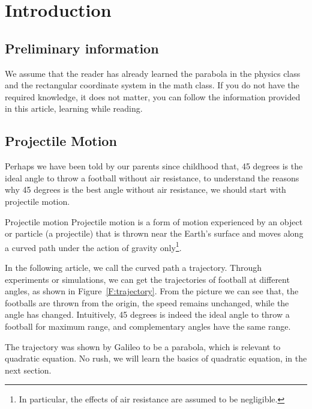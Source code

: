 \section{Introduction}\label{S:introduction}
\subsection{Preliminary information}
We assume that the reader has already learned the parabola in the physics class and the rectangular coordinate system in the math class. If you do not have the required knowledge, it does not matter, you can follow the information provided in this article, learning while reading.


\subsection{Projectile Motion}
Perhaps we have been told by our parents since childhood that, 45 degrees is the ideal angle to throw a football without air resistance, to understand the reasons why 45 degrees is the best angle without air resistance, we should start with projectile motion\cite{wiki:projectile_motion}.

\begin{defnbox}{Projectile motion}
    Projectile motion is a form of motion experienced by an object or particle (a projectile) that is thrown near the Earth's surface and moves along a curved path under the action of gravity only\footnote{In particular, the effects of air resistance are assumed to be negligible.}.
\end{defnbox}

In the following article, we call the curved path a trajectory\cite{wiki:trajectory}. Through experiments or simulations, we can get the trajectories of football at different angles, as shown in Figure~\ref{F:trajectory}. From the picture we can see that, the footballs are thrown from the origin, the speed remains unchanged, while the angle has changed. Intuitively, 45 degrees is indeed the ideal angle to throw a football for maximum range, and complementary angles have the same range.

The trajectory was shown by Galileo to be a parabola, which is relevant to quadratic equation. No rush, we will learn the basics of quadratic equation, in the next section.

